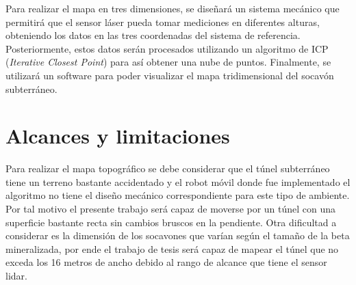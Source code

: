 Para realizar el mapa en tres dimensiones, se diseñar\'a un sistema mec\'anico 
que permitir\'a que el sensor l\'aser pueda tomar mediciones en diferentes 
alturas, obteniendo los datos en las tres coordenadas del sistema de 
referencia. Posteriormente, estos datos serán procesados utilizando un 
algoritmo de ICP (\textit{Iterative Closest Point}) para as\'i obtener una 
nube de puntos. Finalmente, se utilizar\'a un software para poder visualizar 
el mapa tridimensional del socavón subterr\'aneo.



\section{Alcances y limitaciones}

Para realizar el mapa topogr\'afico se debe considerar que el t\'unel subterr\'aneo 
tiene un terreno bastante accidentado y el robot m\'ovil donde fue implementado el 
algoritmo no tiene el diseño mec\'anico correspondiente para este tipo de ambiente. Por 
tal motivo el presente trabajo ser\'a capaz de moverse por un t\'unel con una superficie 
bastante recta sin cambios bruscos en la pendiente. Otra dificultad a considerar es la 
dimensi\'on de los socavones que var\'ian seg\'un el tama\~no de la beta mineralizada, por 
ende el trabajo de tesis ser\'a capaz de mapear el t\'unel que no exceda los 16 metros de 
ancho debido al rango de alcance que tiene el sensor lidar. 

